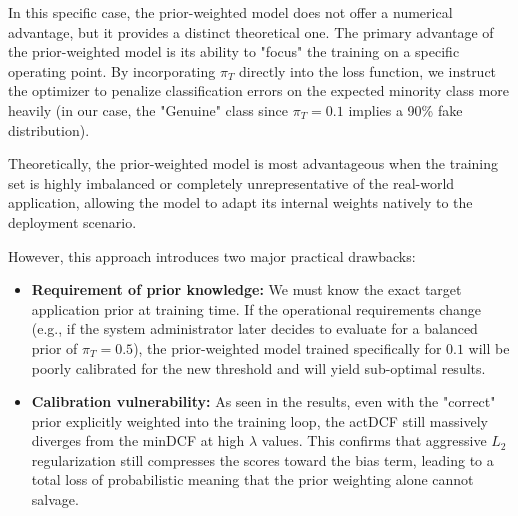 In this specific case, the prior-weighted model does not offer a numerical advantage, but it provides a distinct theoretical one. The primary advantage of the prior-weighted model is its ability to "focus" the training on a specific operating point. By incorporating $\pi_T$ directly into the loss function, we instruct the optimizer to penalize classification errors on the expected minority class more heavily (in our case, the "Genuine" class since $\pi_T=0.1$ implies a 90\% fake distribution). 

Theoretically, the prior-weighted model is most advantageous when the training set is highly imbalanced or completely unrepresentative of the real-world application, allowing the model to adapt its internal weights natively to the deployment scenario.

However, this approach introduces two major practical drawbacks:
\begin{itemize}
    \item \textbf{Requirement of prior knowledge:} We must know the exact target application prior at training time. If the operational requirements change (e.g., if the system administrator later decides to evaluate for a balanced prior of $\pi_T = 0.5$), the prior-weighted model trained specifically for $0.1$ will be poorly calibrated for the new threshold and will yield sub-optimal results.
    \item \textbf{Calibration vulnerability:} As seen in the results, even with the "correct" prior explicitly weighted into the training loop, the actDCF still massively diverges from the minDCF at high $\lambda$ values. This confirms that aggressive $L_2$ regularization still compresses the scores toward the bias term, leading to a total loss of probabilistic meaning that the prior weighting alone cannot salvage.
\end{itemize}
